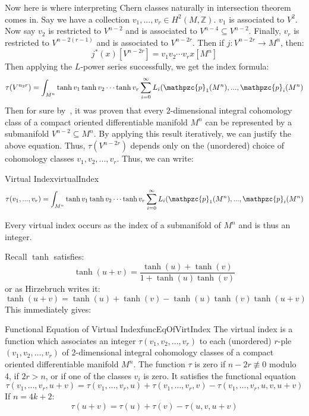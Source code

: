 \documentclass{book}
\newcommand{\Z}{{\mathbb{Z}}}
\newcommand{\cp}{{\mathpzc{p}}}
\newcommand{\sse}{\subseteq}
\begin{document}
Now here is where interpreting Chern classes naturally in intersection theorem comes in. Say we have
a collection $v_1, ..., v_r \in H^2(M, \Z)$. $v_1$ is associated to $V^2$. Now say $v_2$ is restricted to $V^{n-2}$ and
is associated to $V^{n-4} \sse V^{n-2}$. Finally, $v_r$ is restricted to $V^{n-2(r-1)}$ and is associated to
$V^{n-2r}$. Then if $j: V^{n-2r} \to M^n$, then:
\[
  j^*(x)[V^{n-2r}] = v_1v_2\cdots v_rx[M^n]
\]
Then applying the $L$-power series successfully, we get the index formula:
\[
  \tau(V^{n_2r}) = \int_{M^n} \tanh v_1\tanh v_2 \cdots \tanh v_r \sum_{i=0}^\infty L_i(\cp_1(M^n), ...,
  \cp_i(M^n)
\]
Then for sure by~\cite{NateKTheory}, it was proven that every $2$-dimensional integral cohomology class of
a compact oriented differentiable manifold $M^n$ can be represented by a submanifold $V^{n-2} \sse M^n$. By
applying this result iteratively, we can justify the above equation. Thus, $\tau(V^{n-2r})$ depends only on
the (unordered) choice of cohomology classes $v_1,v_2, ..., v_r$. Thus, we can write:
\begin{defn}{Virtual Index}{virtualIndex}
\[
  \tau(v_1, ..., v_r) = \int_{M^n} \tanh v_1\tanh v_2 \cdots \tanh v_r \sum_{i=0}^\infty L_i(\cp_1(M^n), ...,
  \cp_i(M^n)
\]
\end{defn}

Every virtual index occurs as the index of a submanifold of $M^n$ and is thus an integer.

Recall $\tanh$ satisfies:
\[
  \tanh(u+v) = \frac{\tanh(u) + \tanh(v)}{1  +\tanh(u)\tanh(v)}
\]
or as Hirzebruch writes it:
\[
  \tanh(u+v) = \tanh(u) + \tanh(v) - \tanh(u)\tanh(v)\tanh(u+v)
\]
This immediately gives:

\begin{thm}{Functional Equation of Virtual Index}{funcEqOfVirtIndex}
The virtual index is a function which associates an integer $\tau(v_1, v_2, \ldots, v_r)$ to each (unordered)
$r$-ple $(v_1, v_2, \ldots, v_r)$ of 2-dimensional integral cohomology classes of a compact oriented
differentiable manifold $M^n$. The function $\tau$ is zero if $n-2r \not\equiv 0$ modulo 4, if $2r > n$, or if
one of the classes $v_i$ is zero. It satisfies the functional equation
\[
    \tau(v_1,\ldots,v_r,u+v) = \tau(v_1,\ldots,v_r,u) + \tau(v_1,\ldots,v_r,v) - \tau(v_1,\ldots,v_r,u,v,u+v)
\]
If $n = 4k+2$:
\[
  \tau(u+v) = \tau(u) + \tau(v) - \tau(u,v,u+v)
\]
\end{thm}

\end{document}
